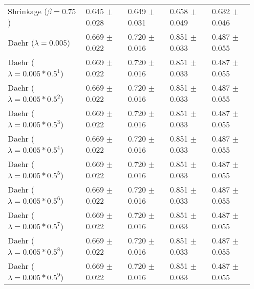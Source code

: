 \begin{table}
\begin{tabular}{*{5}{l}}
Shrinkage ($\beta=0.75$)&0.645 $\pm$ 0.028&0.649 $\pm$ 0.031&0.658 $\pm$ 0.049&0.632 $\pm$ 0.046\\
Daehr ($\lambda=0.005$)&0.669 $\pm$ 0.022&0.720 $\pm$ 0.016&0.851 $\pm$ 0.033&0.487 $\pm$ 0.055\\
Daehr ($\lambda=0.005*0.5^1$)&0.669 $\pm$ 0.022&0.720 $\pm$ 0.016&0.851 $\pm$ 0.033&0.487 $\pm$ 0.055\\
Daehr ($\lambda=0.005*0.5^2$)&0.669 $\pm$ 0.022&0.720 $\pm$ 0.016&0.851 $\pm$ 0.033&0.487 $\pm$ 0.055\\
Daehr ($\lambda=0.005*0.5^3$)&0.669 $\pm$ 0.022&0.720 $\pm$ 0.016&0.851 $\pm$ 0.033&0.487 $\pm$ 0.055\\
Daehr ($\lambda=0.005*0.5^4$)&0.669 $\pm$ 0.022&0.720 $\pm$ 0.016&0.851 $\pm$ 0.033&0.487 $\pm$ 0.055\\
Daehr ($\lambda=0.005*0.5^5$)&0.669 $\pm$ 0.022&0.720 $\pm$ 0.016&0.851 $\pm$ 0.033&0.487 $\pm$ 0.055\\
Daehr ($\lambda=0.005*0.5^6$)&0.669 $\pm$ 0.022&0.720 $\pm$ 0.016&0.851 $\pm$ 0.033&0.487 $\pm$ 0.055\\
Daehr ($\lambda=0.005*0.5^7$)&0.669 $\pm$ 0.022&0.720 $\pm$ 0.016&0.851 $\pm$ 0.033&0.487 $\pm$ 0.055\\
Daehr ($\lambda=0.005*0.5^8$)&0.669 $\pm$ 0.022&0.720 $\pm$ 0.016&0.851 $\pm$ 0.033&0.487 $\pm$ 0.055\\
Daehr ($\lambda=0.005*0.5^9$)&0.669 $\pm$ 0.022&0.720 $\pm$ 0.016&0.851 $\pm$ 0.033&0.487 $\pm$ 0.055\\
\bottomrule
\end{tabular}
\end{table}

